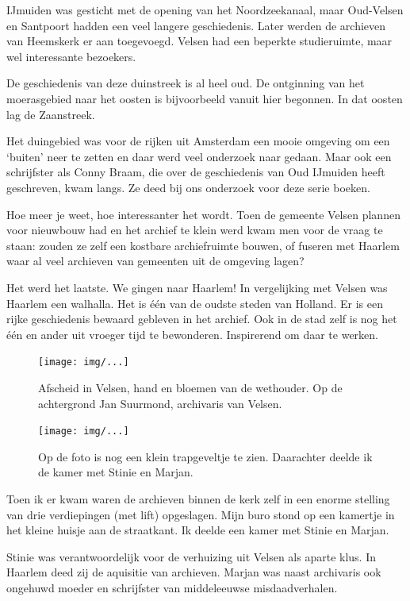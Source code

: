 \documentclass[12pt,twoside]{memoir}
\begin{document}
IJmuiden was gesticht met de opening van het Noordzeekanaal, maar Oud-Velsen en Santpoort hadden een veel langere geschiedenis. Later werden de archieven van Heemskerk er aan toegevoegd. Velsen had een beperkte studieruimte, maar wel interessante bezoekers. 

De geschiedenis van deze duinstreek is al heel oud. De ontginning van het moerasgebied naar het oosten is bijvoorbeeld vanuit hier begonnen. In dat oosten lag de Zaanstreek. 

Het duingebied was voor de rijken uit Amsterdam een mooie omgeving om een `buiten' neer te zetten en daar werd veel onderzoek naar gedaan. Maar ook een schrijfster als Conny Braam, die over de geschiedenis van Oud IJmuiden heeft geschreven, kwam langs. Ze deed bij ons onderzoek voor deze serie boeken.

Hoe meer je weet, hoe interessanter het wordt. Toen de gemeente Velsen plannen voor nieuwbouw had en het archief te klein werd kwam men voor de vraag te staan: zouden ze zelf een kostbare archiefruimte bouwen, of fuseren met Haarlem waar al veel archieven van gemeenten uit de omgeving lagen? 

Het werd het laatste. We gingen naar Haarlem! In vergelijking met Velsen was Haarlem een walhalla. Het is één van de oudste steden van Holland. Er is een rijke geschiedenis bewaard gebleven in het archief. Ook in de stad zelf is nog het één en ander uit vroeger tijd te bewonderen. Inspirerend om daar te werken. 

\begin{figure}[t]
\texttt{[image: img/...]}
\caption{Afscheid in Velsen, hand en bloemen van de wethouder. Op de achtergrond Jan Suurmond, archivaris van Velsen.}
\end{figure}

\begin{figure}[t]
\texttt{[image: img/...]}
\caption{Op de foto is nog een klein trapgeveltje te zien. Daarachter deelde ik de kamer met Stinie en Marjan.}
\end{figure}

Toen ik er kwam waren de archieven binnen de kerk zelf in een enorme stelling van drie verdiepingen (met lift) opgeslagen. Mijn buro stond op een kamertje in het kleine huisje aan de straatkant. Ik deelde een kamer met Stinie en Marjan.

Stinie was verantwoordelijk voor de verhuizing uit Velsen als aparte klus. In Haarlem deed zij de aquisitie van archieven. Marjan was naast archivaris ook ongehuwd moeder en schrijfster van middeleeuwse misdaadverhalen.
\end{document}
